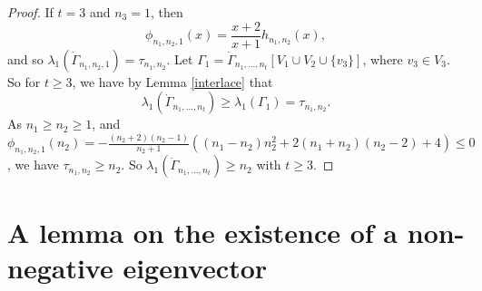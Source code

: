 \documentclass[10pt,a4paper]{amsart}
\numberwithin{equation}{section}
\begin{document}
\begin{proof}
If $t=3$ and $n_3=1$, then 
\[
\phi_{n_1,n_2,1}(x)=\frac{x+2}{x+1}h_{n_1,n_2}(x),  
\]
and so $\lambda_1(\dot\Gamma_{n_1, n_2, 1})=\tau_{n_1,n_2}$. 
Let $\Gamma_1=\dot\Gamma_{n_1, \dots, n_t}[V_1\cup V_2\cup \{v_3\}]$, where $v_3\in V_3$. 
So for $t\ge 3$, we have by Lemma \ref{interlace} that 
\[
\lambda_1(\dot\Gamma_{n_1, \dots, n_t})\ge \lambda_1(\Gamma_1)=\tau_{n_1,n_2}.
\]
As $n_1\ge n_2\ge 1$, and 
$\phi_{n_1,n_2,1}(n_2)=-\frac{(n_2+2)(n_2-1)}{n_2+1}\left((n_1-n_2)n_2^2+2(n_1+n_2)(n_2-2)+4\right)\le 0$, we have  $\tau_{n_1,n_2}\ge n_2$.
So $\lambda_1(\dot\Gamma_{n_1, \dots, n_t})\ge n_2$ with $t\ge 3$. 
%
\end{proof}





\section{A lemma on the existence of a non-negative eigenvector}
\end{document}
